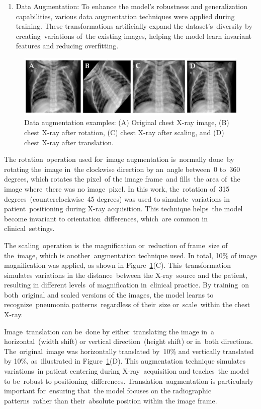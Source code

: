 \documentclass[
  twocolumn,
  10pt,
  a4paper,
  journal
]{IEEEtran}
\begin{document}
\begin{enumerate}
\def\labelenumi{\arabic{enumi}.}
\setcounter{enumi}{3}
\item
  Data Augmentation: To enhance the model's robustness
  and generalization capabilities, various data augmentation techniques
  were applied during training. These transformations artificially
  expand the dataset's~diversity by creating~variations
  of~the existing images, helping the model learn invariant features and
  reducing overfitting.
\end{enumerate}

\begin{figure}[!t]
\centering
\includegraphics[width=\columnwidth]{figures/figure3.png}
\caption{Data augmentation examples: (A) Original chest X-ray image, (B) chest X-ray after rotation, (C) chest X-ray after scaling, and (D) chest X-ray after translation.}
\label{fig:data_augmentation}
\end{figure}

The rotation~operation used for~image augmentation is~normally done~by
rotating the~image in~the clockwise direction by an~angle between~0
to~360 degrees, which rotates the pixel~of the image frame~and fills~the
area of~the image where~there was no image~pixel. In this work,
the~rotation of~315 degrees~(counterclockwise~45 degrees) was used to
simulate~variations in patient~positioning during X-ray acquisition.
This technique helps~the model become invariant to
orientation~differences, which~are common in clinical~settings.

The scaling~operation is~the magnification or~reduction of frame~size of
the~image, which is another~augmentation technique used. In total, 10\%
of image magnification was applied, as shown in Figure~\ref{fig:data_augmentation}(C).
This~transformation simulates variations in the distance~between the
X-ray~source and the patient, resulting in different levels~of
magnification in~clinical practice. By training~on both~original and
scaled versions of the images, the model learns to recognize~pneumonia
patterns~regardless of their~size or~scale~within the chest X-ray.

Image~translation can be~done by either~translating the image in~a
horizontal~(width shift) or vertical direction~(height shift) or in~both
directions. The~original~image was horizontally translated by~10\% and
vertically translated by 10\%, as~illustrated in Figure~\ref{fig:data_augmentation}(D). This
augmentation technique simulates variations~in patient centering during
X-ray~acquisition and teaches~the model to be~robust to
positioning~differences. Translation~augmentation is particularly
important for~ensuring that~the model focuses on the radiographic
patterns~rather than their~absolute position within the image frame.
\end{document}
